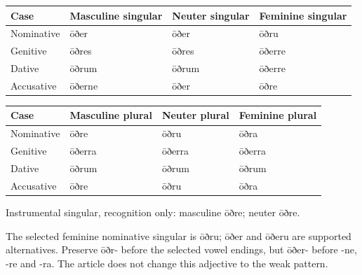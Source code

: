 \par\begingroup
\fontsize{10.5}{13.2}\selectfont
\setlength{\LTleft}{0pt}\setlength{\LTright}{\fill}
\noindent
\begin{tabular}{@{}>{\raggedright\arraybackslash}p{22.0mm}>{\raggedright\arraybackslash}p{31.188mm}>{\raggedright\arraybackslash}p{31.188mm}>{\raggedright\arraybackslash}p{31.188mm}@{}}
\toprule
\textbf{Case} & \textbf{Masculine singular} & \textbf{Neuter singular} & \textbf{Feminine singular} \\
\midrule
Nominative & ōðer & ōðer & ōðru \\
Genitive & ōðres & ōðres & ōðerre \\
Dative & ōðrum & ōðrum & ōðerre \\
Accusative & ōðerne & ōðer & ōðre \\
\bottomrule
\end{tabular}
\par\endgroup
\par\addvspace{5pt}
\par\begingroup
\fontsize{10.5}{13.2}\selectfont
\setlength{\LTleft}{0pt}\setlength{\LTright}{\fill}
\noindent
\begin{tabular}{@{}>{\raggedright\arraybackslash}p{22.0mm}>{\raggedright\arraybackslash}p{31.188mm}>{\raggedright\arraybackslash}p{31.188mm}>{\raggedright\arraybackslash}p{31.188mm}@{}}
\toprule
\textbf{Case} & \textbf{Masculine plural} & \textbf{Neuter plural} & \textbf{Feminine plural} \\
\midrule
Nominative & ōðre & ōðru & ōðra \\
Genitive & ōðerra & ōðerra & ōðerra \\
Dative & ōðrum & ōðrum & ōðrum \\
Accusative & ōðre & ōðru & ōðra \\
\bottomrule
\end{tabular}
\par\endgroup
Instrumental singular, recognition only: masculine ōðre; neuter ōðre.

The selected feminine nominative singular is ōðru; ōðer and ōðeru are supported alternatives. Preserve ōðr- before the selected vowel endings, but ōðer- before -ne, -re and -ra. The article does not change this adjective to the weak pattern.

